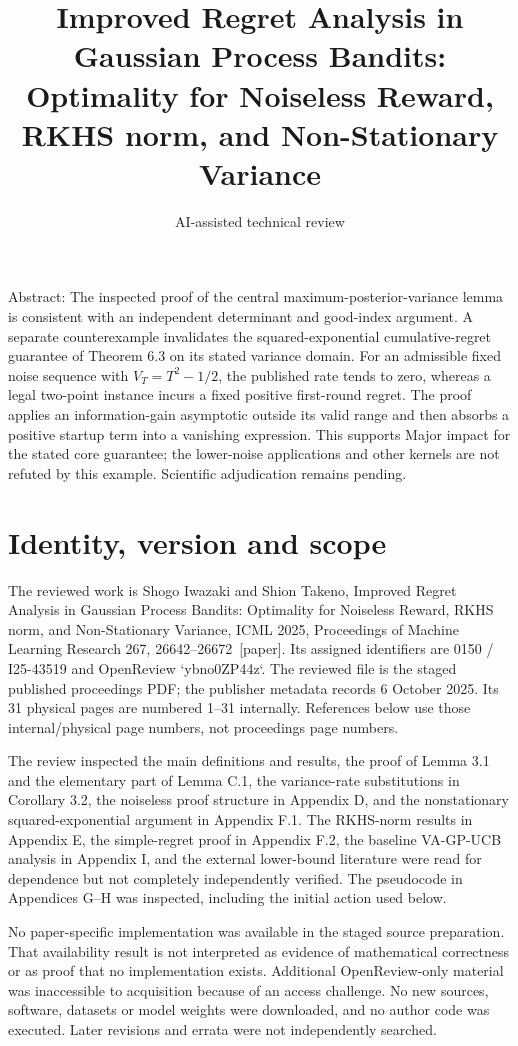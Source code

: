 \documentclass[10pt]{article}
\title{Improved Regret Analysis in Gaussian Process Bandits: Optimality for Noiseless Reward, RKHS norm, and Non-Stationary Variance}
\author{AI-assisted technical review}
\date{}
\begin{document}
\maketitle
Abstract: The inspected proof of the central maximum-posterior-variance lemma is consistent with an independent determinant and good-index argument. A separate counterexample invalidates the squared-exponential cumulative-regret guarantee of Theorem 6.3 on its stated variance domain. For an admissible fixed noise sequence with \(V_T=T^2-1/2\), the published rate tends to zero, whereas a legal two-point instance incurs a fixed positive first-round regret. The proof applies an information-gain asymptotic outside its valid range and then absorbs a positive startup term into a vanishing expression. This supports Major impact for the stated core guarantee; the lower-noise applications and other kernels are not refuted by this example. Scientific adjudication remains pending.\par
\section*{Identity, version and scope}
The reviewed work is Shogo Iwazaki and Shion Takeno, Improved Regret Analysis in Gaussian Process Bandits: Optimality for Noiseless Reward, RKHS norm, and Non-Stationary Variance, ICML 2025, Proceedings of Machine Learning Research 267, 26642–26672 [paper]. Its assigned identifiers are 0150 / I25-43519 and OpenReview `ybno0ZP44z`. The reviewed file is the staged published proceedings PDF; the publisher metadata records 6 October 2025. Its 31 physical pages are numbered 1–31 internally. References below use those internal/physical page numbers, not proceedings page numbers.\par
The review inspected the main definitions and results, the proof of Lemma 3.1 and the elementary part of Lemma C.1, the variance-rate substitutions in Corollary 3.2, the noiseless proof structure in Appendix D, and the nonstationary squared-exponential argument in Appendix F.1. The RKHS-norm results in Appendix E, the simple-regret proof in Appendix F.2, the baseline VA-GP-UCB analysis in Appendix I, and the external lower-bound literature were read for dependence but not completely independently verified. The pseudocode in Appendices G–H was inspected, including the initial action used below.\par
No paper-specific implementation was available in the staged source preparation. That availability result is not interpreted as evidence of mathematical correctness or as proof that no implementation exists. Additional OpenReview-only material was inaccessible to acquisition because of an access challenge. No new sources, software, datasets or model weights were downloaded, and no author code was executed. Later revisions and errata were not independently searched.\par
\end{document}

